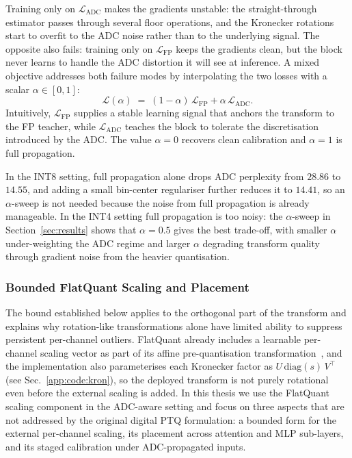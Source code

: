 \documentclass[a4paper,11pt,oneside]{article}
\theoremstyle{breakstyle}
\begin{document}
  Training only on $\mathcal{L}_{\mathrm{ADC}}$ makes the gradients
  unstable: the straight-through estimator passes through several
  floor operations, and the Kronecker rotations start to overfit to
  the ADC noise rather than to the underlying signal. The opposite
  also fails: training only on $\mathcal{L}_{\mathrm{FP}}$ keeps the
  gradients clean, but the block never learns to handle the ADC
  distortion it will see at inference. A mixed objective addresses
  both failure modes by interpolating the two losses with a scalar
  $\alpha \in [0,1]$:
  \begin{equation}
      \mathcal{L}(\alpha)
      \;=\;
      (1 - \alpha)\,\mathcal{L}_{\mathrm{FP}}
      + \alpha\,\mathcal{L}_{\mathrm{ADC}}.
      \label{eq:alpha_mix}
  \end{equation}
  Intuitively, $\mathcal{L}_{\mathrm{FP}}$ supplies a stable learning
  signal that anchors the transform to the FP teacher, while
  $\mathcal{L}_{\mathrm{ADC}}$ teaches the block to tolerate the
  discretisation introduced by the ADC. The value $\alpha = 0$
  recovers clean calibration and $\alpha = 1$ is full propagation.

  In the INT8 setting, full propagation alone drops ADC perplexity
  from $28.86$ to $14.55$, and adding a small bin-center regulariser
  further reduces it to $14.41$, so an $\alpha$-sweep is not needed
  because the noise from full propagation is already manageable. In
  the INT4 setting full propagation is too noisy: the $\alpha$-sweep
  in Section~\ref{sec:results} shows that $\alpha = 0.5$ gives the
  best trade-off, with smaller $\alpha$ under-weighting the ADC
  regime and larger $\alpha$ degrading transform quality through
  gradient noise from the heavier quantisation.



  \subsubsection{Bounded FlatQuant Scaling and Placement}
  \label{sec:diagonals}

  The bound established below applies to the orthogonal part of the
  transform and explains why rotation-like transformations alone
  have limited ability to suppress persistent per-channel outliers.
  FlatQuant already includes a learnable per-channel scaling
  vector as part of its affine pre-quantisation
  transformation~\cite{FlatQuant2024}, and the implementation also
  parameterises each Kronecker factor as
  $U\,\mathrm{diag}(s)\,V^{\top}$ (see Sec.~\ref{app:code:kron}),
  so the deployed transform is not purely rotational even before
  the external scaling is added.  In this thesis we use the
  FlatQuant scaling component in the ADC-aware setting and focus
  on three aspects that are not addressed by the original digital
  PTQ formulation: a bounded form for the external per-channel
  scaling, its placement across attention and MLP sub-layers, and
  its staged calibration under ADC-propagated inputs.
\end{document}
